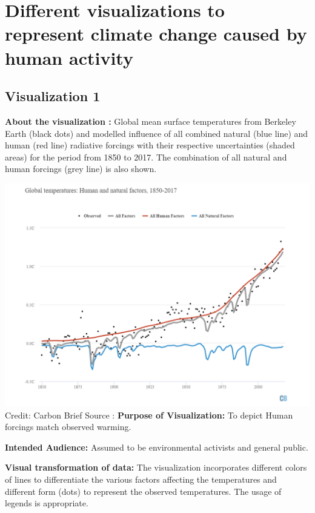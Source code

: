 \documentclass[]{book}
\begin{document}
\hypertarget{different-visualizations-to-represent-climate-change-caused-by-human-activity}{%
\section{Different visualizations to represent climate change caused by human activity}\label{different-visualizations-to-represent-climate-change-caused-by-human-activity}}

\hypertarget{visualization-1}{%
\subsection{Visualization 1}\label{visualization-1}}

\textbf{About the visualization :}
Global mean surface temperatures from Berkeley Earth (black dots) and modelled influence of all combined natural (blue line) and human (red line) radiative forcings with their respective uncertainties (shaded areas) for the period from 1850 to 2017. The combination of all natural and human forcings (grey line) is also shown.

\includegraphics{images/Vz1-HumanNatural.png}
Credit: Carbon Brief
Source :\citep{Global}
\textbf{Purpose of Visualization:} To depict Human forcings match observed warming.

\textbf{Intended Audience:} Assumed to be environmental activists and general public.

\textbf{Visual transformation of data:} The visualization incorporates different colors of lines to differentiate the various factors affecting the temperatures and different form (dots) to represent the observed temperatures. The usage of legends is appropriate.
\end{document}
